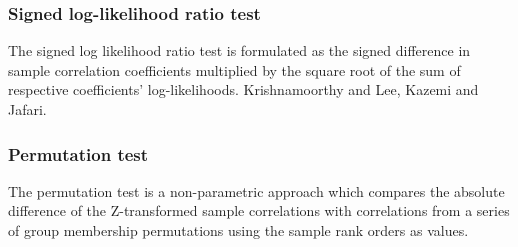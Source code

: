   
  

\subsubsection{Signed log-likelihood ratio test}
The signed log likelihood ratio test is formulated as the signed difference in sample correlation coefficients multiplied by the square root of the sum of respective coefficients' log-likelihoods. Krishnamoorthy and Lee, Kazemi and Jafari.
  
  


\subsubsection{Permutation test}
The permutation test is a non-parametric approach which compares the absolute difference of the Z-transformed sample correlations with correlations from a series of group membership permutations using the sample rank orders as values.

